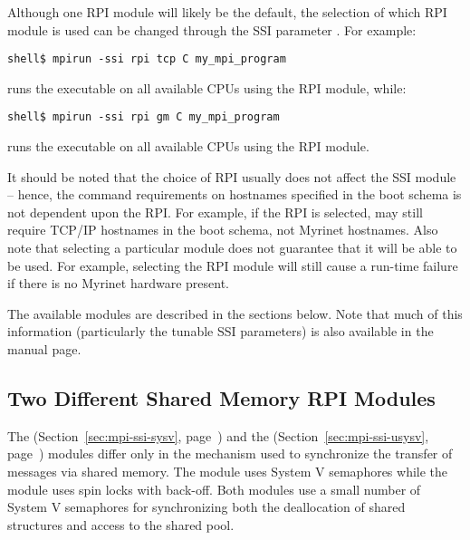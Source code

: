 Although one RPI module will likely be the default, the selection of
which RPI module is used can be changed through the SSI parameter
.  For example:

\lstset{style=lam-cmdline}
\begin{lstlisting}
shell$ mpirun -ssi rpi tcp C my_mpi_program
\end{lstlisting}

\noindent runs the  executable on all
available CPUs using the  RPI module, while:

\lstset{style=lam-cmdline}
\begin{lstlisting}
shell$ mpirun -ssi rpi gm C my_mpi_program
\end{lstlisting}

\noindent runs the  executable on all
available CPUs using the  RPI module.

It should be noted that the choice of RPI usually does not affect the
 SSI module -- hence, the  command
requirements on hostnames specified in the boot schema is not
dependent upon the RPI.  For example, if the  RPI is selected,
 may still require TCP/IP hostnames in the boot schema,
not Myrinet hostnames.  Also note that selecting a particular module
does not guarantee that it will be able to be used.  For example,
selecting the  RPI module will still cause a run-time failure
if there is no Myrinet hardware present.

The available modules are described in the sections below.  Note that
much of this information (particularly the tunable SSI parameters) is
also available in the  manual page.



\subsection{Two Different Shared Memory RPI Modules}
\label{sec:mpi-ssi-shmem}

The  (Section~\ref{sec:mpi-ssi-sysv},
page~\pageref{sec:mpi-ssi-sysv}) and the 
(Section~\ref{sec:mpi-ssi-usysv}, page~\pageref{sec:mpi-ssi-usysv})
modules differ only in the mechanism used to synchronize the transfer
of messages via shared memory.
%
The  module uses System V semaphores while the 
module uses spin locks with back-off.
%
Both modules use a small number of System V semaphores for
synchronizing both the deallocation of shared structures and access to
the shared pool.

